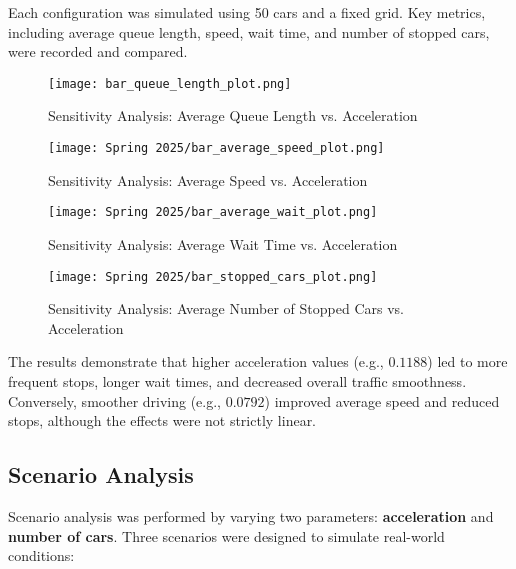 \documentclass[12pt]{article}
\begin{document}
Each configuration was simulated using 50 cars and a fixed grid. Key metrics, including average queue length, speed, wait time, and number of stopped cars, were recorded and compared.

\vspace{1em}
\begin{figure}[H]
    \centering
    \texttt{[image: bar\_queue\_length\_plot.png]}
    \caption{Sensitivity Analysis: Average Queue Length vs. Acceleration}
    \label{fig:sensitivity-queue}
\end{figure}

\vspace{1em}
\begin{figure}[H]
    \centering
    \texttt{[image: Spring 2025/bar\_average\_speed\_plot.png]}
    \caption{Sensitivity Analysis: Average Speed vs. Acceleration}
    \label{fig:sensitivity-speed}
\end{figure}

\vspace{1em}
\begin{figure}[H]
    \centering
    \texttt{[image: Spring 2025/bar\_average\_wait\_plot.png]}
    \caption{Sensitivity Analysis: Average Wait Time vs. Acceleration}
    \label{fig:sensitivity-wait}
\end{figure}

\vspace{1em}
\begin{figure}[H]
    \centering
    \texttt{[image: Spring 2025/bar\_stopped\_cars\_plot.png]}
    \caption{Sensitivity Analysis: Average Number of Stopped Cars vs. Acceleration}
    \label{fig:sensitivity-stopped}
\end{figure}

The results demonstrate that higher acceleration values (e.g., $0.1188$) led to more frequent stops, longer wait times, and decreased overall traffic smoothness. Conversely, smoother driving (e.g., $0.0792$) improved average speed and reduced stops, although the effects were not strictly linear.

\subsection{Scenario Analysis}

Scenario analysis was performed by varying two parameters: \textbf{acceleration} and \textbf{number of cars}. Three scenarios were designed to simulate real-world conditions:
\end{document}
